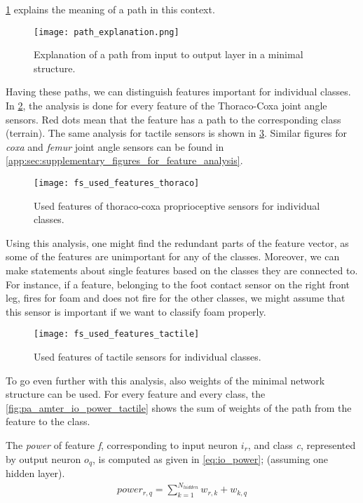 \cref{img:path_explanation} explains the meaning of a path in this context.

\begin{figure}[H]
  \centering
  \texttt{[image: path\_explanation.png]}
  \caption{Explanation of a path from input to output layer in a minimal structure.}
  \label{img:path_explanation}
\end{figure}

Having these paths, we can distinguish features important for individual classes. In \cref{fig:pa_amter_used_features_thoraco}, the analysis is done for every feature of the Thoraco-Coxa joint angle sensors. Red dots mean that the feature has a path to the corresponding class (terrain). The same analysis for tactile sensors is shown in \cref{fig:pa_amter_used_features_tactile}. Similar figures for \textit{coxa} and \textit{femur} joint angle sensors can be found in \cref{app:sec:supplementary_figures_for_feature_analysis}.

\begin{figure}[H]
  \centering
  \texttt{[image: fs\_used\_features\_thoraco]}
  \caption{Used features of thoraco-coxa proprioceptive sensors for individual classes.}
  \label{fig:pa_amter_used_features_thoraco}
\end{figure}

Using this analysis, one might find the redundant parts of the feature vector, as some of the features are unimportant for any of the classes. Moreover, we can make statements about single features based on the classes they are connected to. For instance, if a feature, belonging to the foot contact sensor on the right front leg, fires for foam and does not fire for the other classes, we might assume that this sensor is important if we want to classify foam properly.

\begin{figure}[H]
  \centering
  \texttt{[image: fs\_used\_features\_tactile]}
  \caption{Used features of tactile sensors for individual classes.}
  \label{fig:pa_amter_used_features_tactile}
\end{figure}

To go even further with this analysis, also weights of the minimal network structure can be used. For every feature and every class, the \cref{fig:pa_amter_io_power_tactile} shows the sum of weights of the path from the feature to the class. 

The \textit{power} of feature \textit{f}, corresponding to input neuron $ i_r $, and class \textit{c}, represented by output neuron $ o_q $, is computed as given in \cref{eq:io_power}; (assuming one hidden layer).
\noindent
\begin{align} \label{eq:io_power}
power_{r,q} = \displaystyle{\sum_{k=1}^{N_{hidden}} w_{r, k} + w_{k, q}}
\end{align}

